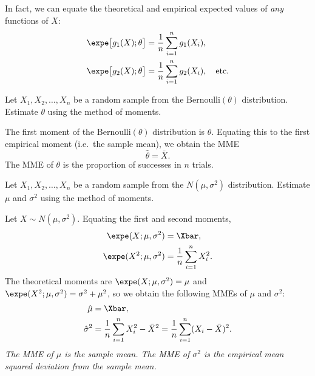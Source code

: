 \begin{remark}
In fact, we can equate the theoretical and empirical expected values of \emph{any} functions of $X$:
\begin{align*}
\expe\big[g_1(X);\mathbf{\theta}\big] & = \frac{1}{n}\sum_{i=1}^n g_1(X_i), \\
\expe\big[g_2(X);\mathbf{\theta}\big] & = \frac{1}{n}\sum_{i=1}^n g_2(X_i), \quad\text{etc.}
\end{align*}
\end{remark}

\begin{example}
Let $X_1,X_2,\ldots,X_n$ be a random sample from the $\text{Bernoulli}(\theta)$ distribution. Estimate $\theta$ using the method of moments.
\end{example}
\begin{solution}
The first moment of the $\text{Bernoulli}(\theta)$ distribution is $\theta$. 
Equating this to the first empirical moment (i.e.\ the sample mean), we obtain the MME
\[
\hat{\theta} = \bar{X}.
\]
The MME of $\theta$ is the proportion of successes in $n$ trials.
\end{solution}



\begin{example}
Let $X_1,X_2,\ldots,X_n$ be a random sample from the $N(\mu,\sigma^2)$ distribution. Estimate $\mu$ and $\sigma^2$ using the method of moments.
\end{example}

\begin{solution}
Let $X\sim N(\mu,\sigma^2)$. Equating the first and second moments,
\begin{align*}
\expe(X;\mu,\sigma^2)	& = \Xbar, \\
\expe(X^2;\mu,\sigma^2)	& = \frac{1}{n}\sum_{i=1}^n X_i^2.
\end{align*}
The theoretical moments are $\expe(X;\mu,\sigma^2) = \mu$ and $\expe(X^2;\mu,\sigma^2) = \sigma^2 + \mu^2$, so we obtain the following MMEs of $\mu$ and $\sigma^2$:
\begin{align*}
\hat{\mu}			& = \Xbar, \\
\hat{\sigma}^2	& = \frac{1}{n}\sum_{i=1}^n X_i^2 - \bar{X}^2 = \frac{1}{n}\sum_{i=1}^n (X_i-\bar{X})^2.
\end{align*}
\bit
\it The MME of $\mu$ is the \emph{sample mean}.
\it The MME of $\sigma^2$ is the \emph{empirical mean squared deviation from the sample mean}.
\eit
\end{solution}



